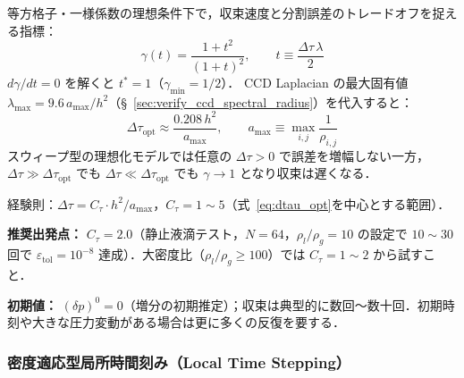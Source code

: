 \begin{tcolorbox}[resultbox, title={最適仮想時間刻み $\Delta\tau$ の理論（詳細：付録 §\ref{sec:dtau_derive}）}]
\label{result:dtau_opt}
等方格子・一様係数の理想条件下で，収束速度と分割誤差のトレードオフを捉える指標：
\[
  \gamma(t) = \frac{1 + t^2}{(1+t)^2},
  \qquad t \equiv \frac{\Delta\tau\,\lambda}{2}
\]
$d\gamma/dt = 0$ を解くと $t^* = 1$（$\gamma_{\min} = 1/2$）．
CCD Laplacian の最大固有値 $\lambda_{\max} = 9.6\,a_{\max}/h^2$（§~\ref{sec:verify_ccd_spectral_radius}）を代入すると：
\begin{equation}
  \Delta\tau_{\mathrm{opt}}
  \approx \frac{0.208\,h^2}{a_{\max}},
  \qquad
  a_{\max} \equiv \max_{i,j} \frac{1}{\rho_{i,j}}
  \label{eq:dtau_opt}
\end{equation}
スウィープ型の理想化モデルでは任意の $\Delta\tau > 0$ で誤差を増幅しない一方，
$\Delta\tau \gg \Delta\tau_{\mathrm{opt}}$ でも $\Delta\tau \ll \Delta\tau_{\mathrm{opt}}$ でも
$\gamma \to 1$ となり収束は遅くなる．
\end{tcolorbox}

\label{box:dtau_impl}
経験則：$\Delta\tau = C_\tau \cdot h^2/a_{\max}$，$C_\tau = 1 \sim 5$（式~\eqref{eq:dtau_opt}を中心とする範囲）．

\textbf{推奨出発点：} $C_\tau = 2.0$（静止液滴テスト，$N=64$，$\rho_l/\rho_g=10$ の設定で $10\sim30$ 回で $\varepsilon_\text{tol}=10^{-8}$ 達成）．大密度比（$\rho_l/\rho_g \geq 100$）では $C_\tau=1\sim2$ から試すこと．

\textbf{初期値：} $(\delta p)^0 = 0$（増分の初期推定）；収束は典型的に数回〜数十回．初期時刻や大きな圧力変動がある場合は更に多くの反復を要する．

\subsubsection{密度適応型局所時間刻み（Local Time Stepping）}
\label{sec:lts_dtau}

